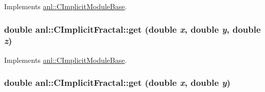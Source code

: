 Implements \hyperlink{classanl_1_1CImplicitModuleBase_a3cf520bdab59631864253c03b4e1723f}{anl::CImplicitModuleBase}.\hypertarget{classanl_1_1CImplicitFractal_a25ac928857e827545123d8f5098e5131}{
\subsubsection[{get}]{\setlength{\rightskip}{0pt plus 5cm}double anl::CImplicitFractal::get (double {\em x}, \/  double {\em y}, \/  double {\em z})}}
\label{classanl_1_1CImplicitFractal_a25ac928857e827545123d8f5098e5131}


Implements \hyperlink{classanl_1_1CImplicitModuleBase_ac17d592612c82ba3d47f9229a00b1fe3}{anl::CImplicitModuleBase}.\hypertarget{classanl_1_1CImplicitFractal_a9ce533cdedbee58d917e8db1ab632d2f}{
\subsubsection[{get}]{\setlength{\rightskip}{0pt plus 5cm}double anl::CImplicitFractal::get (double {\em x}, \/  double {\em y})}}
\label{classanl_1_1CImplicitFractal_a9ce533cdedbee58d917e8db1ab632d2f}


